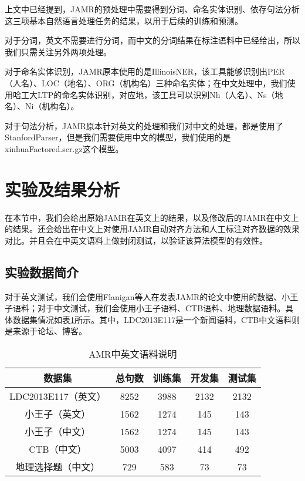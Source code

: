 \documentclass[master, winfont]{njuthesis}
\begin{document}
上文中已经提到，JAMR的预处理中需要得到分词、命名实体识别、依存句法分析这三项基本自然语言处理任务的结果，以用于后续的训练和预测。

对于分词，英文不需要进行分词，而中文的分词结果在标注语料中已经给出，所以我们只需关注另外两项处理。

对于命名实体识别，JAMR原本使用的是IllinoisNER，该工具能够识别出PER（人名）、LOC（地名）、ORG（机构名）三种命名实体；在中文处理中，我们使用哈工大LTP的命名实体识别，对应地，该工具可以识别Nh（人名）、Ns（地名）、Ni（机构名）。

对于句法分析，JAMR原本针对英文的处理和我们对中文的处理，都是使用了StanfordParser，但是我们需要使用中文的模型，我们使用的是xinhuaFactored.ser.gz这个模型。

\section{实验及结果分析}
在本节中，我们会给出原始JAMR在英文上的结果，以及修改后的JAMR在中文上的结果。还会给出在中文上对使用JAMR自动对齐方法和人工标注对齐数据的效果对比。并且会在中英文语料上做封闭测试，以验证该算法模型的有效性。

\subsection{实验数据简介}
对于英文测试，我们会使用Flanigan等人\cite{Flanigan2014}在发表JAMR的论文中使用的数据、小王子语料；对于中文测试，我们会使用小王子语料、CTB语料、地理数据语料。具体数据集情况如表\ref{amrdatas}所示。其中，LDC2013E117是一个新闻语料，CTB中文语料则是来源于论坛、博客。

\begin{table}[!htbp]
\begin{center}
\begin{tabular}{c|c|c|c|c}
\hline {数据集} & {总句数} & {训练集} & {开发集} & {测试集} \\
\hline LDC2013E117（英文） & 8252 & 3988 & 2132 & 2132 \\
\hline 小王子（英文） & 1562 & 1274 & 145 & 143 \\
\hline 小王子（中文） & 1562 & 1274 & 145 & 143 \\
\hline CTB（中文） & 5003 & 4097 & 414 & 492 \\
\hline 地理选择题（中文） & 729 & 583 & 73 & 73 \\
\hline
\end{tabular}
\end{center}
\caption{\label{amrdatas} AMR中英文语料说明}
\end{table}
\end{document}
